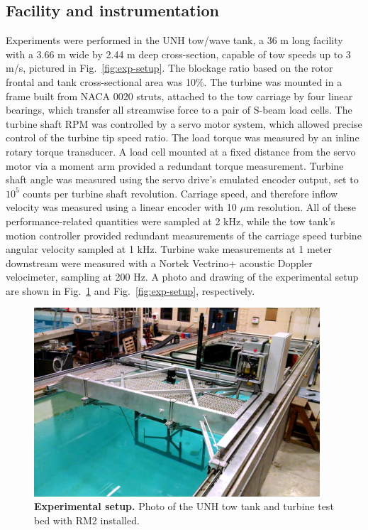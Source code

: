 \documentclass[10pt,letterpaper]{article}
\begin{document}
\subsection*{Facility and instrumentation}

Experiments were performed in the UNH tow/wave tank, a 36 m long facility with a
3.66 m wide by 2.44 m deep cross-section, capable of tow speeds up to 3 m/s,
pictured in Fig.~\ref{fig:exp-setup}. The blockage ratio based on the rotor
frontal and tank cross-sectional area was 10\%. The turbine was mounted in a
frame built from NACA 0020 struts, attached to the tow carriage by four linear
bearings, which transfer all streamwise force to a pair of S-beam load cells.
The turbine shaft RPM was controlled by a servo motor system, which allowed
precise control of the turbine tip speed ratio. The load torque was measured by
an inline rotary torque transducer. A load cell mounted at a fixed distance from
the servo motor via a moment arm provided a redundant torque measurement.
Turbine shaft angle was measured using the servo drive's emulated encoder
output, set to $10^5$ counts per turbine shaft revolution. Carriage speed, and
therefore inflow velocity was measured using a linear encoder with 10 $\mu$m
resolution. All of these performance-related quantities were sampled at 2 kHz,
while the tow tank's motion controller provided redundant measurements of the
carriage speed turbine angular velocity sampled at 1 kHz. Turbine wake
measurements at 1 meter downstream were measured with a Nortek Vectrino+
acoustic Doppler velocimeter, sampling at 200 Hz. A photo and drawing of the
experimental setup are shown in Fig.~\ref{fig:exp-setup-photo} and
Fig.~\ref{fig:exp-setup}, respectively.


\begin{figure}[h]
    \centering

    \includegraphics[width=0.95\textwidth]{figures/exp-setup-photo}

    \caption{\textbf{Experimental setup.} Photo of the UNH tow tank and turbine
    test bed with RM2 installed.}

    \label{fig:exp-setup-photo}
\end{figure}
\end{document}
